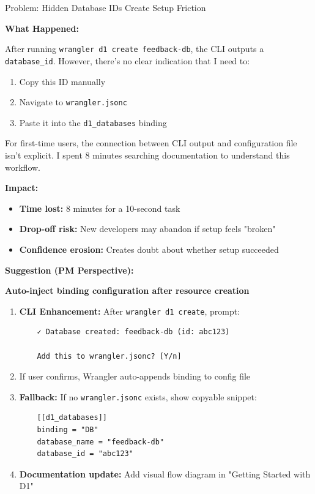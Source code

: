 \documentclass[11pt,a4paper]{article}
\begin{document}
\begin{insightbox}{Problem: Hidden Database IDs Create Setup Friction}

\textbf{What Happened:}

After running \texttt{wrangler d1 create feedback-db}, the CLI outputs a \texttt{database\_id}. However, there's no clear indication that I need to:
\begin{enumerate}
    \item Copy this ID manually
    \item Navigate to \texttt{wrangler.jsonc}
    \item Paste it into the \texttt{d1\_databases} binding
\end{enumerate}

For first-time users, the connection between CLI output and configuration file isn't explicit. I spent 8 minutes searching documentation to understand this workflow.

\vspace{0.5em}

\textbf{Impact:}
\begin{itemize}
    \item \textbf{Time lost:} 8 minutes for a 10-second task
    \item \textbf{Drop-off risk:} New developers may abandon if setup feels "broken"
    \item \textbf{Confidence erosion:} Creates doubt about whether setup succeeded
\end{itemize}

\end{insightbox}

\textbf{Suggestion (PM Perspective):}

\textcolor{cfOrange}{\textbf{Auto-inject binding configuration after resource creation}}

\begin{enumerate}[leftmargin=*, itemsep=0.5em]
    \item \textbf{CLI Enhancement:} After \texttt{wrangler d1 create}, prompt:
    \begin{verbatim}
    ✓ Database created: feedback-db (id: abc123)
    
    Add this to wrangler.jsonc? [Y/n]
    \end{verbatim}
    
    \item If user confirms, Wrangler auto-appends binding to config file
    
    \item \textbf{Fallback:} If no \texttt{wrangler.jsonc} exists, show copyable snippet:
    \begin{verbatim}
    [[d1_databases]]
    binding = "DB"
    database_name = "feedback-db"
    database_id = "abc123"
    \end{verbatim}
    
    \item \textbf{Documentation update:} Add visual flow diagram in "Getting Started with D1"
\end{enumerate}
\end{document}
